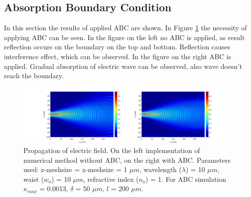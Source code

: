 \documentclass[a4paper]{article}
\begin{document}
	\subsection{Absorption Boundary Condition}
	In this section the results of applied ABC are shown. In Figure \ref{fig:Absorption2} the necessity of applying ABC can be seen. In the figure on the left no ABC is applied, as result reflection occurs on the boundary on the top and bottom. Reflection causes interference effect, which can be observed. In the figure on the right ABC is applied. Gradual absorption of electric wave can be observed, also wave doesn't reach the boundary.
	
	\begin{figure}[h!]
		\hspace{-30mm}
		\includegraphics[width=1.5\textwidth]{N3.jpg}
		\caption{\label{fig:Absorption2}Propagation of electric field. On the left implementation of numerical method without ABC, on the right with ABC. Parameters used: z-meshsize = x-meshsize  = 1 $\mu m$, wavelength ($\lambda$) = 10 $\mu m$, waist ($w_o$) = 10 $\mu m$, refractive index ($n_o$) = 1. For ABC simulation $\kappa_{max}$ = 0.0013, $\delta$ =  50 $\mu m$, $l$ = 200 $\mu m$.}
	\end{figure}
\end{document}
